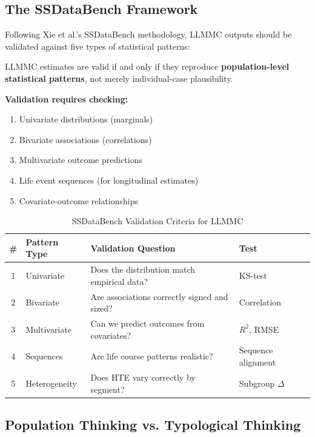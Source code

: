 \subsection{The SSDataBench Framework}

Following Xie et al.'s SSDataBench methodology, LLMMC outputs should be validated
against five types of statistical patterns:

\begin{tcolorbox}[colback=blue!5!white, colframe=blue!75!black,
    title=Axiom CAL-5: Population Statistical Realism (Xie Criterion)]
LLMMC estimates are valid if and only if they reproduce \textbf{population-level
statistical patterns}, not merely individual-case plausibility.

\textbf{Validation requires checking:}
\begin{enumerate}[nosep]
\item Univariate distributions (marginals)
\item Bivariate associations (correlations)
\item Multivariate outcome predictions
\item Life event sequences (for longitudinal estimates)
\item Covariate-outcome relationships
\end{enumerate}
\end{tcolorbox}

\begin{table}[h]
\centering
\caption{SSDataBench Validation Criteria for LLMMC}
\label{tab:ssdatabench}
\begin{tabular}{clp{5cm}l}
\toprule
\textbf{\#} & \textbf{Pattern Type} & \textbf{Validation Question} & \textbf{Test} \\
\midrule
1 & Univariate & Does the distribution match empirical data? & KS-test \\
2 & Bivariate & Are associations correctly signed and sized? & Correlation \\
3 & Multivariate & Can we predict outcomes from covariates? & $R^2$, RMSE \\
4 & Sequences & Are life course patterns realistic? & Sequence alignment \\
5 & Heterogeneity & Does HTE vary correctly by segment? & Subgroup $\Delta$ \\
\bottomrule
\end{tabular}
\end{table}

\subsection{Population Thinking vs. Typological Thinking}

